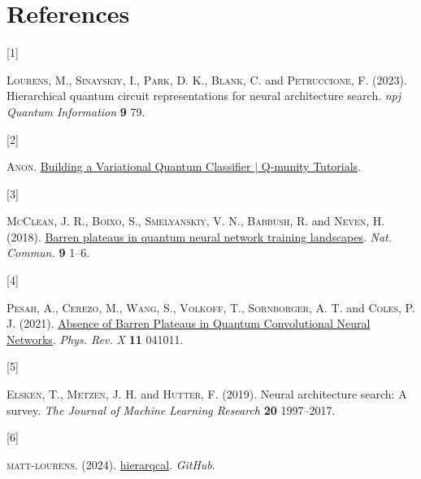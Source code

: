 \documentclass[
  13pt,
  a4paper,
  DIV=11,
  numbers=noendperiod]{scrreprt}
\newlength{\cslhangindent}
\newlength{\csllabelwidth}
\newenvironment{CSLReferences}[2] %
 {\begin{list}{}{%
  \setlength{\itemindent}{0pt}
  \setlength{\leftmargin}{0pt}
  \setlength{\parsep}{0pt}
  \ifodd #1
   \setlength{\leftmargin}{\cslhangindent}
   \setlength{\itemindent}{-1\cslhangindent}
  \fi
  \setlength{\itemsep}{#2\baselineskip}}}
 {\end{list}}
\newcommand{\CSLLeftMargin}[1]{\parbox[t]{\csllabelwidth}{\strut#1\strut}}
\newcommand{\CSLRightInline}[1]{\parbox[t]{\linewidth - \csllabelwidth}{\strut#1\strut}}
\begin{document}

\chapter*{References}\label{references}


\label{refs}
\begin{CSLReferences}{0}{1}
\CSLLeftMargin{{[}1{]} }%
\CSLRightInline{\textsc{Lourens}, M., \textsc{Sinayskiy}, I.,
\textsc{Park}, D. K., \textsc{Blank}, C. and \textsc{Petruccione}, F.
(2023). Hierarchical quantum circuit representations for neural
architecture search. \emph{npj Quantum Information} \textbf{9} 79.}

\CSLLeftMargin{{[}2{]} }%
\CSLRightInline{\textsc{Anon}.
\href{https://www.qmunity.tech/tutorials/building-a-variational-quantum-classifier}{{Building
a Variational Quantum Classifier {\(\vert\)} Q-munity Tutorials}}.}

\CSLLeftMargin{{[}3{]} }%
\CSLRightInline{\textsc{McClean}, J. R., \textsc{Boixo}, S.,
\textsc{Smelyanskiy}, V. N., \textsc{Babbush}, R. and \textsc{Neven}, H.
(2018). \href{https://doi.org/10.1038/s41467-018-07090-4}{{Barren
plateaus in quantum neural network training landscapes}}. \emph{Nat.
Commun.} \textbf{9} 1--6.}

\CSLLeftMargin{{[}4{]} }%
\CSLRightInline{\textsc{Pesah}, A., \textsc{Cerezo}, M., \textsc{Wang},
S., \textsc{Volkoff}, T., \textsc{Sornborger}, A. T. and \textsc{Coles},
P. J. (2021). \href{https://doi.org/10.1103/PhysRevX.11.041011}{{Absence
of Barren Plateaus in Quantum Convolutional Neural Networks}}.
\emph{Phys. Rev. X} \textbf{11} 041011.}

\CSLLeftMargin{{[}5{]} }%
\CSLRightInline{\textsc{Elsken}, T., \textsc{Metzen}, J. H. and
\textsc{Hutter}, F. (2019). Neural architecture search: A survey.
\emph{The Journal of Machine Learning Research} \textbf{20} 1997--2017.}

\CSLLeftMargin{{[}6{]} }%
\CSLRightInline{\textsc{matt-lourens}. (2024).
\href{https://github.com/matt-lourens/hierarqcal?tab=readme-ov-file}{{hierarqcal}}.
\emph{GitHub}.}


\end{CSLReferences}
\end{document}
